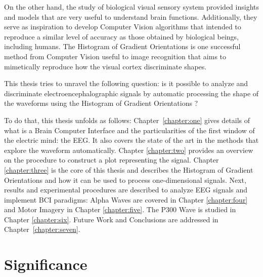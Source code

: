 
On the other hand, the study of biological visual sensory system provided insights and models that are very useful to understand brain functions.  Additionally, they serve as inspiration to develop Computer Vision algorithms that intended to reproduce a similar level of accuracy as those obtained by biological beings, including humans.  The Histogram of Gradient Orientations is one successful method from Computer Vision useful to image recognition that aims to mimetically reproduce how the visual cortex discriminate shapes.

This thesis tries to unravel the following question:  is it possible to analyze and discriminate electroencephalographic signals by automatic processing the shape of the waveforms using the Histogram of Gradient Orientations ?


To do that, this thesis unfolds as follows: Chapter~\ref{chapter:one} gives details of what is a Brain Computer Interface and the particularities of the first window of the electric mind: the EEG. It also covers the state of the art in the methods that explore the waveform automatically.  Chapter \ref{chapter:two} provides an overview on the procedure to construct a plot representing the signal. Chapter \ref{chapter:three} is the core of this thesis and describes the Histogram of Gradient Orientations and how it can be used to process one-dimensional signals.
Next, results and experimental procedures are described to analyze EEG signals and implement BCI paradigms:  Alpha Waves are covered in Chapter \ref{chapter:four} and Motor Imagery in Chapter \ref{chapter:five}. The P300 Wave is studied in Chapter \ref{chapter:six}.  Future Work and Conclusions are addressed in Chapter~\ref{chapter:seven}.  


\section{Significance}

